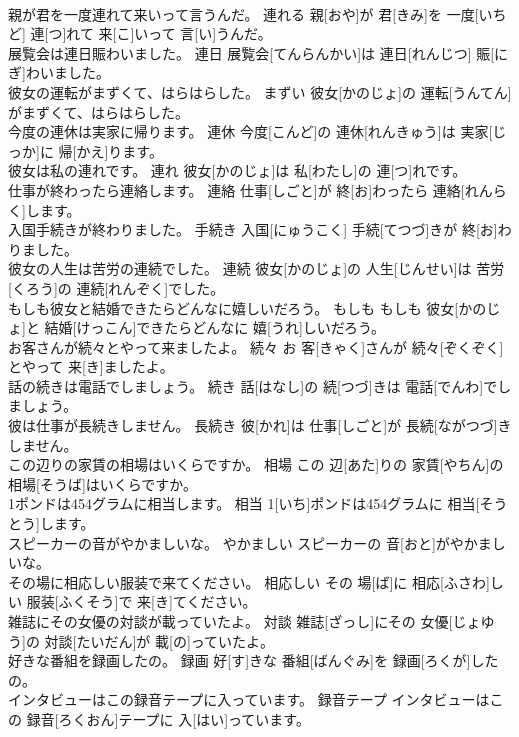 \documentclass[8pt]{extreport}
\begin{document}
\begin{CJK}{UTF8}{min}
\\	親が君を一度連れて来いって言うんだ。	連れる	親[おや]が 君[きみ]を 一度[いちど] 連[つ]れて 来[こ]いって 言[い]うんだ。	
\\	展覧会は連日賑わいました。	連日	展覧会[てんらんかい]は 連日[れんじつ] 賑[にぎ]わいました。	
\\	彼女の運転がまずくて、はらはらした。	まずい	彼女[かのじょ]の 運転[うんてん]がまずくて、はらはらした。	
\\	今度の連休は実家に帰ります。	連休	今度[こんど]の 連休[れんきゅう]は 実家[じっか]に 帰[かえ]ります。	
\\	彼女は私の連れです。	連れ	彼女[かのじょ]は 私[わたし]の 連[つ]れです。	
\\	仕事が終わったら連絡します。	連絡	仕事[しごと]が 終[お]わったら 連絡[れんらく]します。	
\\	入国手続きが終わりました。	手続き	入国[にゅうこく] 手続[てつづ]きが 終[お]わりました。	
\\	彼女の人生は苦労の連続でした。	連続	彼女[かのじょ]の 人生[じんせい]は 苦労[くろう]の 連続[れんぞく]でした。	
\\	もしも彼女と結婚できたらどんなに嬉しいだろう。	もしも	もしも 彼女[かのじょ]と 結婚[けっこん]できたらどんなに 嬉[うれ]しいだろう。	
\\	お客さんが続々とやって来ましたよ。	続々	お 客[きゃく]さんが 続々[ぞくぞく]とやって 来[き]ましたよ。	
\\	話の続きは電話でしましょう。	続き	話[はなし]の 続[つづ]きは 電話[でんわ]でしましょう。	
\\	彼は仕事が長続きしません。	長続き	彼[かれ]は 仕事[しごと]が 長続[ながつづ]きしません。	
\\	この辺りの家賃の相場はいくらですか。	相場	この 辺[あた]りの 家賃[やちん]の 相場[そうば]はいくらですか。	
\\	1ポンドは454グラムに相当します。	相当	1[いち]ポンドは454グラムに 相当[そうとう]します。	
\\	スピーカーの音がやかましいな。	やかましい	スピーカーの 音[おと]がやかましいな。	
\\	その場に相応しい服装で来てください。	相応しい	その 場[ば]に 相応[ふさわ]しい 服装[ふくそう]で 来[き]てください。	
\\	雑誌にその女優の対談が載っていたよ。	対談	雑誌[ざっし]にその 女優[じょゆう]の 対談[たいだん]が 載[の]っていたよ。	
\\	好きな番組を録画したの。	録画	好[す]きな 番組[ばんぐみ]を 録画[ろくが]したの。	
\\	インタビューはこの録音テープに入っています。	録音テープ	インタビューはこの 録音[ろくおん]テープに 入[はい]っています。	

\end{CJK}
\end{document}
